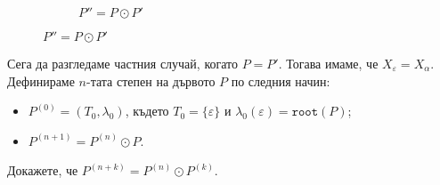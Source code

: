 \begin{problem}
\begin{figure}[htp]
\begin{subfigure}[t]{0.5\textwidth}
        \caption{$P'' = P \odot P'$}
      \end{subfigure}
    \end{figure}
  \end{problem}
  
  Сега да разгледаме частния случай, когато $P = P'$. Тогава имаме, че $X_\varepsilon = X_\alpha$.
  Дефинираме $n$-тата степен на дървото $P$ по следния начин:
  \begin{itemize}
\item
  $P^{(0)} = (T_0,\lambda_0)$, където $T_0 = \{\varepsilon\}$ и $\lambda_0(\varepsilon) = \texttt{root}(P)$;
\item
  $P^{(n+1)} = P^{(n)} \odot P$.
\end{itemize}

\begin{problem}
  Докажете, че $P^{(n+k)} = P^{(n)} \odot P^{(k)}$.
\end{problem}

